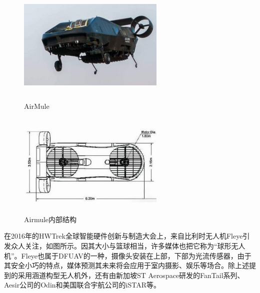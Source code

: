 \begin{figure}[htbp]
	\centering
	\begin{minipage}[c]{0.5\textwidth} %
		\centering
		\includegraphics[width=7cm,height=5cm]{Fig/AirMule.jpg}
		\caption{\label{AirMule}AirMule}
	\end{minipage}%
	\begin{minipage}[c]{0.5\textwidth}
		\centering
		\includegraphics[width=7cm,height=5cm]{Fig/Airmule内部结构.png}
		\caption{\label{AirMule2}Airmule内部结构}
	\end{minipage}
\end{figure}

在2016年的HWTrek全球智能硬件创新与制造大会上，来自比利时无人机Fleye引发众人关注，如图所示。因其大小与篮球相当，许多媒体也把它称为“球形无人机”。Fleye也属于DFUAV的一种，摄像头安装在上部，下部为光流传感器，由于其安全小巧的特点，媒体预测其未来将会应用于室内摄影、娱乐等场合。除上述提到的采用涵道构型无人机外，还有由新加坡ST Aerospace研发的FanTail系列\cite{mateosanguinoDesignStabilizationCoanda2024}、Aesir公司的Odin\cite{crivoi2013survey}和美国联合宇航公司的iSTAR\cite{flemingImprovingControlSystem,lipera2001micro}等。

